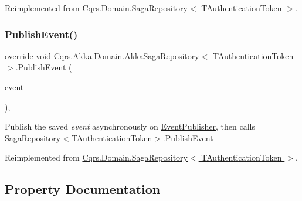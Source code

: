 Reimplemented from \hyperlink{classCqrs_1_1Domain_1_1SagaRepository_acb23e0bd3e5655547a13b4ad2b06e548_acb23e0bd3e5655547a13b4ad2b06e548}{Cqrs.\+Domain.\+Saga\+Repository$<$ T\+Authentication\+Token $>$}.

\mbox{\label{classCqrs_1_1Akka_1_1Domain_1_1AkkaSagaRepository_a7f6375bb99e680792466fb420232a535_a7f6375bb99e680792466fb420232a535}} 
\subsubsection{\texorpdfstring{Publish\+Event()}{PublishEvent()}}
{\footnotesize\ttfamily override void \hyperlink{classCqrs_1_1Akka_1_1Domain_1_1AkkaSagaRepository}{Cqrs.\+Akka.\+Domain.\+Akka\+Saga\+Repository}$<$ T\+Authentication\+Token $>$.Publish\+Event (\begin{DoxyParamCaption}\item[{\hyperlink{interfaceCqrs_1_1Events_1_1ISagaEvent}{I\+Saga\+Event}$<$ T\+Authentication\+Token $>$ @}]{event }\end{DoxyParamCaption})\hspace{0.3cm}{\ttfamily [protected]}, {\ttfamily [virtual]}}



Publish the saved {\itshape event}  asynchronously on \hyperlink{classCqrs_1_1Akka_1_1Domain_1_1AkkaSagaRepository_a25957859d1f98ea7f434983c562e9724_a25957859d1f98ea7f434983c562e9724}{Event\+Publisher}, then calls Saga\+Repository$<$\+T\+Authentication\+Token$>$.\+Publish\+Event 



Reimplemented from \hyperlink{classCqrs_1_1Domain_1_1SagaRepository_a1dec03959e4d859c6cf2be0507b1bc05_a1dec03959e4d859c6cf2be0507b1bc05}{Cqrs.\+Domain.\+Saga\+Repository$<$ T\+Authentication\+Token $>$}.



\subsection{Property Documentation}
\mbox{\label{classCqrs_1_1Akka_1_1Domain_1_1AkkaSagaRepository_a25957859d1f98ea7f434983c562e9724_a25957859d1f98ea7f434983c562e9724}} 
